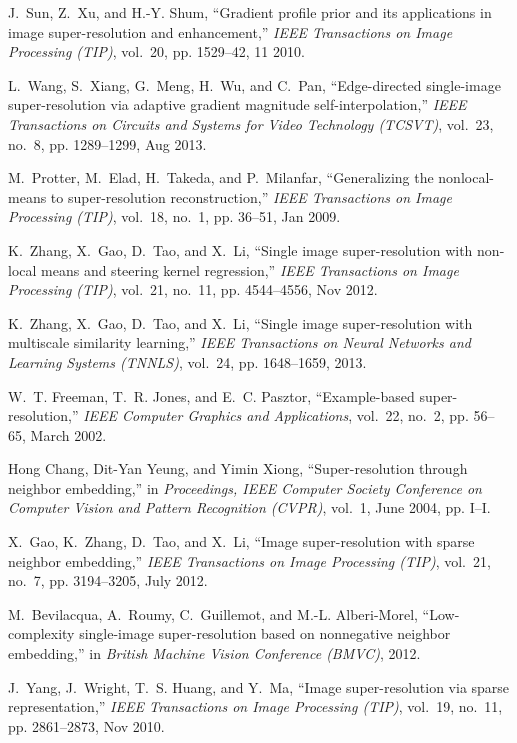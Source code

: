 \documentclass[journal]{IEEEtran}
\begin{document}
\begin{thebibliography}{10}
J.~Sun, Z.~Xu, and H.-Y. Shum, ``Gradient profile prior and its applications in
  image super-resolution and enhancement,'' \emph{IEEE Transactions on Image
  Processing (TIP)}, vol.~20, pp. 1529--42, 11 2010.

L.~{Wang}, S.~{Xiang}, G.~{Meng}, H.~{Wu}, and C.~{Pan}, ``Edge-directed
  single-image super-resolution via adaptive gradient magnitude
  self-interpolation,'' \emph{IEEE Transactions on Circuits and Systems for
  Video Technology (TCSVT)}, vol.~23, no.~8, pp. 1289--1299, Aug 2013.

M.~{Protter}, M.~{Elad}, H.~{Takeda}, and P.~{Milanfar}, ``Generalizing the
  nonlocal-means to super-resolution reconstruction,'' \emph{IEEE Transactions
  on Image Processing (TIP)}, vol.~18, no.~1, pp. 36--51, Jan 2009.

K.~{Zhang}, X.~{Gao}, D.~{Tao}, and X.~{Li}, ``Single image super-resolution
  with non-local means and steering kernel regression,'' \emph{IEEE
  Transactions on Image Processing (TIP)}, vol.~21, no.~11, pp. 4544--4556, Nov
  2012.

K.~Zhang, X.~Gao, D.~Tao, and X.~Li, ``Single image super-resolution with
  multiscale similarity learning,'' \emph{IEEE Transactions on Neural Networks
  and Learning Systems (TNNLS)}, vol.~24, pp. 1648--1659, 2013.

W.~T. {Freeman}, T.~R. {Jones}, and E.~C. {Pasztor}, ``Example-based
  super-resolution,'' \emph{IEEE Computer Graphics and Applications}, vol.~22,
  no.~2, pp. 56--65, March 2002.

{Hong Chang}, {Dit-Yan Yeung}, and {Yimin Xiong}, ``Super-resolution through
  neighbor embedding,'' in \emph{Proceedings, IEEE Computer Society Conference
  on Computer Vision and Pattern Recognition (CVPR)}, vol.~1, June 2004, pp.
  I--I.

X.~{Gao}, K.~{Zhang}, D.~{Tao}, and X.~{Li}, ``Image super-resolution with
  sparse neighbor embedding,'' \emph{IEEE Transactions on Image Processing
  (TIP)}, vol.~21, no.~7, pp. 3194--3205, July 2012.

M.~Bevilacqua, A.~Roumy, C.~Guillemot, and M.-L. Alberi-Morel, ``Low-complexity
  single-image super-resolution based on nonnegative neighbor embedding,'' in
  \emph{British Machine Vision Conference (BMVC)}, 2012.

J.~{Yang}, J.~{Wright}, T.~S. {Huang}, and Y.~{Ma}, ``Image super-resolution
  via sparse representation,'' \emph{IEEE Transactions on Image Processing
  (TIP)}, vol.~19, no.~11, pp. 2861--2873, Nov 2010.


\end{thebibliography}
\end{document}
